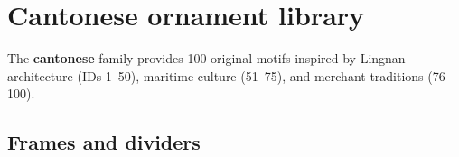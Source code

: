 \chapter{Cantonese ornament library}

The \textbf{cantonese} family provides 100 original motifs inspired by
Lingnan architecture (IDs 1--50), maritime culture (51--75), and
merchant traditions (76--100).

\section{Frames and dividers}

\begin{center}
\end{center}

